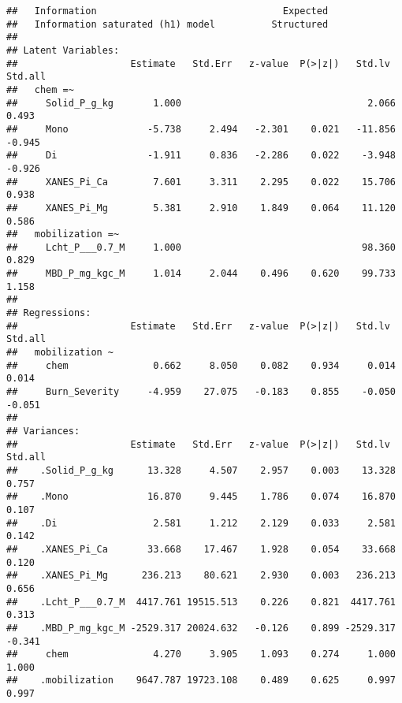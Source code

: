 \documentclass[
]{article}
\begin{document}
\begin{verbatim}
##   Information                                 Expected
##   Information saturated (h1) model          Structured
## 
## Latent Variables:
##                    Estimate   Std.Err   z-value  P(>|z|)   Std.lv   Std.all
##   chem =~                                                                  
##     Solid_P_g_kg       1.000                                 2.066    0.493
##     Mono              -5.738     2.494   -2.301    0.021   -11.856   -0.945
##     Di                -1.911     0.836   -2.286    0.022    -3.948   -0.926
##     XANES_Pi_Ca        7.601     3.311    2.295    0.022    15.706    0.938
##     XANES_Pi_Mg        5.381     2.910    1.849    0.064    11.120    0.586
##   mobilization =~                                                          
##     Lcht_P___0.7_M     1.000                                98.360    0.829
##     MBD_P_mg_kgc_M     1.014     2.044    0.496    0.620    99.733    1.158
## 
## Regressions:
##                    Estimate   Std.Err   z-value  P(>|z|)   Std.lv   Std.all
##   mobilization ~                                                           
##     chem               0.662     8.050    0.082    0.934     0.014    0.014
##     Burn_Severity     -4.959    27.075   -0.183    0.855    -0.050   -0.051
## 
## Variances:
##                    Estimate   Std.Err   z-value  P(>|z|)   Std.lv   Std.all
##    .Solid_P_g_kg      13.328     4.507    2.957    0.003    13.328    0.757
##    .Mono              16.870     9.445    1.786    0.074    16.870    0.107
##    .Di                 2.581     1.212    2.129    0.033     2.581    0.142
##    .XANES_Pi_Ca       33.668    17.467    1.928    0.054    33.668    0.120
##    .XANES_Pi_Mg      236.213    80.621    2.930    0.003   236.213    0.656
##    .Lcht_P___0.7_M  4417.761 19515.513    0.226    0.821  4417.761    0.313
##    .MBD_P_mg_kgc_M -2529.317 20024.632   -0.126    0.899 -2529.317   -0.341
##     chem               4.270     3.905    1.093    0.274     1.000    1.000
##    .mobilization    9647.787 19723.108    0.489    0.625     0.997    0.997
\end{verbatim}
\end{document}
